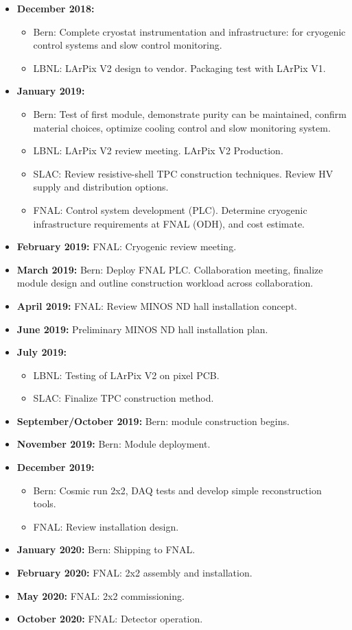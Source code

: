\begin{itemize}
\item {\bf December 2018:}
\begin{itemize}
\item Bern: Complete cryostat instrumentation and infrastructure: for cryogenic control systems and slow control monitoring. 
\item LBNL: LArPix V2 design to vendor. Packaging test with LArPix V1.
\end{itemize}
\item {\bf January 2019:} 
\begin{itemize}
	\item Bern: Test of first module, demonstrate purity can be maintained, confirm material choices, optimize cooling control and slow monitoring system.   
	\item LBNL: LArPix V2 review meeting. LArPix V2 Production.
	\item SLAC: Review resistive-shell TPC construction techniques. Review HV supply and distribution options.   
	\item FNAL: Control system development (PLC). Determine cryogenic infrastructure requirements at FNAL (ODH), and cost 
	estimate.  
\end{itemize}
\item {\bf February 2019:} FNAL: Cryogenic review meeting.  
\item {\bf March 2019:} Bern: Deploy FNAL PLC. Collaboration meeting, finalize module design and outline construction workload across collaboration.    
\item {\bf April 2019:} FNAL: Review MINOS ND hall installation concept.
\item {\bf June 2019:} Preliminary MINOS ND hall installation plan.
\item {\bf July 2019:} 
\begin{itemize}
	\item LBNL: Testing of LArPix V2 on pixel PCB.   
	\item SLAC: Finalize TPC construction method.  
\end{itemize}
\item {\bf September/October 2019:} Bern: module construction begins.
 \item {\bf November 2019:} Bern: Module deployment.
\item {\bf December 2019:} 
\begin{itemize}
	\item Bern: Cosmic run  2x2, DAQ tests and develop simple reconstruction tools.   
	\item FNAL: Review installation design.  
\end{itemize}
\item {\bf January 2020:} Bern: Shipping to FNAL.
\item {\bf February 2020:} FNAL: 2x2 assembly and installation.
\item {\bf May 2020:} FNAL: 2x2 commissioning.    
\item {\bf October 2020:} FNAL: Detector operation.

\end{itemize}
